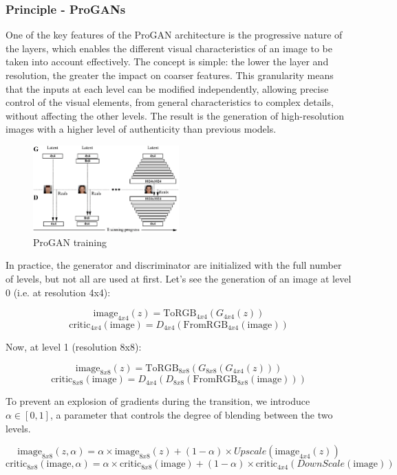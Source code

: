 \documentclass{article}
\begin{document}
\subsubsection*{Principle - ProGANs}
One of the key features of the ProGAN architecture is the progressive nature of the layers, which enables the different visual characteristics of an image to be taken into account effectively. 
The concept is simple: the lower the layer and resolution, the greater the impact on coarser features. 
This granularity means that the inputs at each level can be modified independently, allowing precise control of the visual elements, from general characteristics to complex details, without affecting the other levels. 
The result is the generation of high-resolution images with a higher level of authenticity than previous models.


\begin{figure}[H]
    \centering
    \includegraphics[width=0.5\textwidth]{images/progan.png}
    \caption{ProGAN training}
\end{figure}

In practice, the generator and discriminator are initialized with the full number of levels, but not all are used at first. Let's see the generation of an image at level 0 (i.e. at resolution 4x4):

\[\text{image}_{4x4}(z) = \text{ToRGB}_{4x4}(G_{4x4}(z))\]
\[\text{critic}_{4x4}(\text{image}) = D_{4x4}(\text{FromRGB}_{4x4}(\text{image}))\]

Now, at level 1 (resolution 8x8):

\[\text{image}_{8x8}(z) = \text{ToRGB}_{8x8}(G_{8x8}(G_{4x4}(z)))\]
\[\text{critic}_{8x8}(\text{image}) = D_{4x4}(D_{8x8}(\text{FromRGB}_{8x8}(\text{image})))\]

To prevent an explosion of gradients during the transition, we introduce $\alpha \in \left[0, 1\right]$, a parameter that controls the degree of blending between the two levels.

\[\text{image}_{8x8}(z, \alpha) = \alpha \times \text{image}_{8x8}(z) + (1-\alpha) \times Upscale(\text{image}_{4x4}(z))\]
\[\text{critic}_{8x8}(\text{image}, \alpha) = \alpha \times \text{critic}_{8x8}(\text{image}) + (1-\alpha) \times \text{critic}_{4x4}(DownScale(\text{image}))\]
\end{document}
